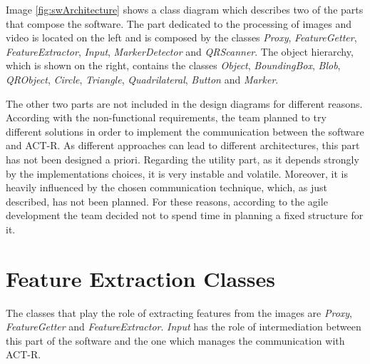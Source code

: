 	Image \ref{fig:swArchitecture} shows a class diagram which describes two of the parts that compose the software. 
	The part dedicated to the processing of images and video is located on the left and is composed by the classes \emph{Proxy}, \emph{FeatureGetter}, \emph{FeatureExtractor}, \emph{Input}, \emph{MarkerDetector} and \emph{QRScanner}.
	The object hierarchy, which is shown on the right, contains the classes \emph{Object}, \emph{BoundingBox}, \emph{Blob}, \emph{QRObject}, \emph{Circle}, \emph{Triangle}, \emph{Quadrilateral}, \emph{Button} and \emph{Marker}.

	

	The other two parts are not included in the design diagrams for different reasons. 
	According with the non-functional requirements, the team planned to try different solutions in order to implement the communication between the software and ACT-R. As different approaches can lead to different architectures, this part has not been designed a priori.
	Regarding the utility part, as it depends strongly by the implementations choices, it is very instable and volatile. Moreover, it is heavily influenced by the chosen communication technique, which, as just described, has not been planned.
	For these reasons, according to the agile development the team decided not to spend time in planning a fixed structure for it.
	
	
	\section{Feature Extraction Classes}\label{featExtraction}	
	The classes that play the role of extracting features from the images are \emph{Proxy}, \emph{FeatureGetter} and \emph{FeatureExtractor}. \emph{Input} has the role of intermediation between this part of the software and the one which manages the communication with \mbox{ACT-R}.

